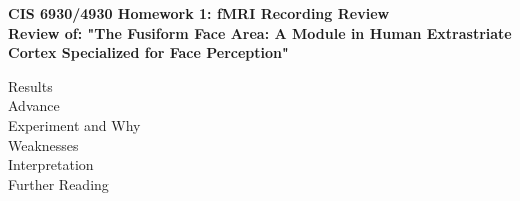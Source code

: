 \documentclass[11pt]{article}
\begin{document}
\begin{center}
{\large {\bf CIS 6930/4930 Homework 1: fMRI Recording Review}}\\
{\normalsize {\bf Review of: "The Fusiform Face Area: A Module in Human Extrastriate Cortex
Specialized for Face Perception"}}
\end{center}

Results \\

Advance \\

Experiment and Why \\

Weaknesses \\

Interpretation \\

Further Reading \\
\end{document}
